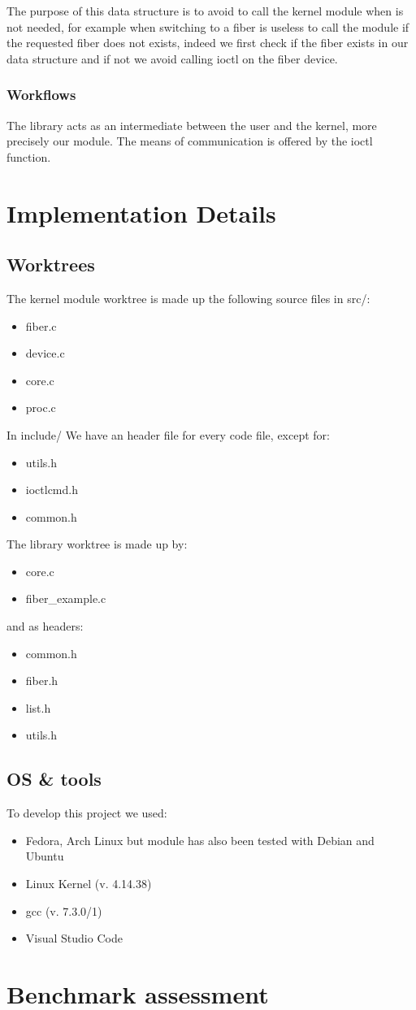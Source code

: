 \documentclass[a4paper,10pt]{article}
\begin{document}
The purpose of this data structure is to avoid to call the kernel module when is not needed, for example when switching to a fiber is useless to call the module if the requested fiber does not exists, indeed we first check if the fiber exists in our data structure and if not we avoid calling ioctl on the fiber device.

\subsubsection{Workflows}
The library acts as an intermediate between the user and the kernel, more precisely our module. The means of communication is offered by the ioctl function.

\section{Implementation Details}
\subsection{Worktrees}
The kernel module worktree is made up the following source files in src/:
\begin{itemize}
	\item fiber.c
	\item device.c
	\item core.c
	\item proc.c
\end{itemize}
In include/ We have an header file for every code file, except for:
\begin{itemize}
	\item utils.h
	\item ioctlcmd.h
	\item common.h
\end{itemize}


The library worktree is made up by:
\begin{itemize}
	\item core.c
	\item fiber\_example.c
\end{itemize}
and as headers:
\begin{itemize}
	\item common.h
	\item fiber.h
	\item list.h
	\item utils.h
\end{itemize}


\subsection{OS \& tools}
To develop this project we used:
\begin{itemize}
	\item Fedora, Arch Linux but module has also been tested with Debian and Ubuntu
	\item Linux Kernel (v. 4.14.38)
	\item gcc (v. 7.3.0/1)
	\item Visual Studio Code
\end{itemize}

\section{Benchmark assessment}
\end{document}
